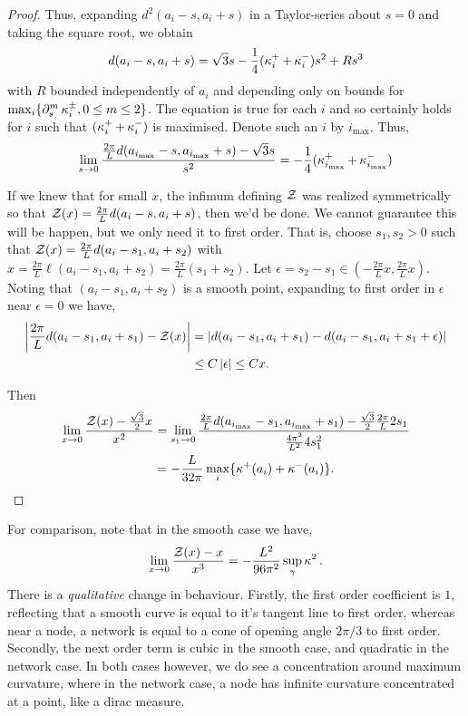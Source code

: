 \documentclass[11pt]{amsart}
\begin{document}
\begin{proof}
Thus, expanding \(d^2(a_i - s, a_i + s)\) in a Taylor-series about \(s = 0\) and taking the square root, we obtain
\[
d(a_i - s, a_i + s) = \sqrt{3} s - \frac{1}{4} (\operatorname{\kappa}^+_i + \operatorname{\kappa}^-_i) s^2 + R s^3
\]
with \(R\) bounded independently of \(a_i\) and depending only on bounds for \(\max_i \{\partial^{m}_s \operatorname{\kappa}_i^{\pm}, 0 \leq m \leq 2\}\). The equation is true for each \(i\) and so certainly holds for \(i\) such that \((\operatorname{\kappa}^+_i + \operatorname{\kappa}^-_i)\) is maximised. Denote such an \(i\) by \(i_{\max}\). Thus,
\[
\lim_{s\to 0} \frac{\tfrac{2\pi}{L} d(a_{i_{\max}} - s, a_{i_{\max}} + s) - \sqrt{3} s}{s^2} = - \frac{1}{4} (\operatorname{\kappa}^+_{i_{\max}} + \operatorname{\kappa}^-_{i_{\max}})
\]

If we knew that for small \(x\), the infimum defining \(\operatorname{\mathcal{Z}}\) was realized symmetrically so that \(\operatorname{\mathcal{Z}}(x) = \tfrac{2\pi}{L} d(a_i - s, a_i + s)\), then we'd be done. We cannot guarantee this will be happen, but we only need it to first order. That is, choose \(s_1, s_2 > 0\) such that \(\operatorname{\mathcal{Z}}(x) = \tfrac{2\pi}{L} d(a_i - s_1, a_i + s_2)\) with \(x = \tfrac{2\pi}{L} \ell(a_i - s_1, a_i + s_2) = \tfrac{2\pi}{L} (s_1 + s_2)\). Let \(\epsilon = s_2 - s_1 \in (-\tfrac{2\pi}{L} x, \tfrac{2\pi}{L}x)\). Noting that \((a_i - s_1, a_i + s_2)\) is a smooth point, expanding to first order in \(\epsilon\) near \(\epsilon = 0\) we have,
\[
\begin{split}
\left|\frac{2\pi}{L} d(a_i - s_1, a_i + s_1) - \operatorname{\mathcal{Z}}(x)\right| &= \left|d(a_i - s_1, a_i + s_1) - d(a_i - s_1, a_i + s_1 + \epsilon)\right| \\
&\leq C\left|\epsilon\right| \leq C x.
\end{split}
\]

Then
\[
\begin{split}
\lim_{x\to 0} \frac{\operatorname{\mathcal{Z}}(x) - \tfrac{\sqrt{3}}{2}x}{x^2} &= \lim_{s_1\to 0} \frac{\tfrac{2\pi}{L} d(a_{i_{\max}} - s_1, a_{i_{\max}} + s_1) - \tfrac{\sqrt{3}}{2} \tfrac{2\pi}{L} 2s_1}{\tfrac{4\pi^2}{L^2} 4 s_1^2} \\
&= - \frac{L}{32\pi} \max_i \{\operatorname{\kappa}^+(a_i) + \operatorname{\kappa}^-(a_i)\}.
\end{split}
\]
\end{proof}

\begin{remark}
For comparison, note that in the smooth case we have,
\[
\lim_{x\to 0} \frac{\operatorname{\mathcal{Z}}(x) - x}{x^3} = - \frac{L^2}{96 \pi^2} \sup_{\gamma} \operatorname{\kappa}^2.
\]
There is a \emph{qualitative} change in behaviour. Firstly, the first order coefficient is \(1\), reflecting that a smooth curve is equal to it's tangent line to first order, whereas near a node, a network is equal to a cone of opening angle \(2\pi/3\) to first order.  Secondly, the next order term is cubic in the smooth case, and quadratic in the network case. In both cases however, we do see a concentration around maximum curvature, where in the network case, a node has infinite curvature concentrated at a point, like a dirac measure.
\end{remark}
\end{document}
